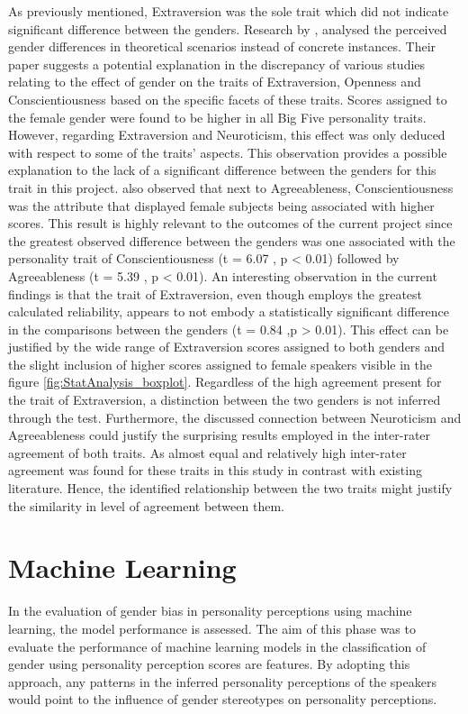 \documentclass{l4proj}
\begin{document}
As previously mentioned, Extraversion was the sole trait which did not indicate significant difference between the genders.
Research by \citet{Löckenhoff2014}, analysed the perceived gender differences in theoretical scenarios instead of concrete instances. Their paper suggests a potential explanation in the discrepancy of various studies relating to the effect of gender on the traits of Extraversion, Openness and Conscientiousness based on the specific facets of these traits. Scores assigned to the female gender were found to be higher in all Big Five personality traits. However, regarding Extraversion and Neuroticism, this effect was only deduced with respect to some of the traits’ aspects. This observation provides a possible explanation to the lack of a significant difference between the genders for this trait in this project.
\citet{Löckenhoff2014} also observed that next to Agreeableness, Conscientiousness was the attribute that displayed female subjects being associated with higher scores. This result is highly relevant to the outcomes of the current project since the greatest observed difference between the genders was one associated with the personality trait of Conscientiousness (t = 6.07 , p < 0.01) followed by Agreeableness (t = 5.39 , p < 0.01). 
An interesting observation in the current findings is that the trait of Extraversion, even though employs the greatest calculated reliability, appears to not embody a statistically significant difference in the comparisons between the genders (t = 0.84 ,p > 0.01). This effect can be justified by the wide range of Extraversion scores assigned to both genders and the slight inclusion of higher scores assigned to female speakers visible in the figure \ref{fig:StatAnalysis_boxplot}. Regardless of the high agreement present for the trait of Extraversion, a distinction between the two genders is not inferred through the test.
Furthermore, the discussed connection between Neuroticism and Agreeableness could justify the surprising results employed in the inter-rater agreement of both traits. As almost equal and relatively high inter-rater agreement was found for these traits in this study in contrast with existing literature. Hence, the identified relationship between the two traits might justify the similarity in level of agreement between them.

\section{Machine Learning}
In the evaluation of gender bias in personality perceptions using machine learning, the model performance is assessed. The aim of this phase was to evaluate the performance of machine learning models in the classification of gender using personality perception scores are features. By adopting this approach, any patterns in the inferred personality perceptions of the speakers would point to the influence of gender stereotypes on personality perceptions.
\end{document}
